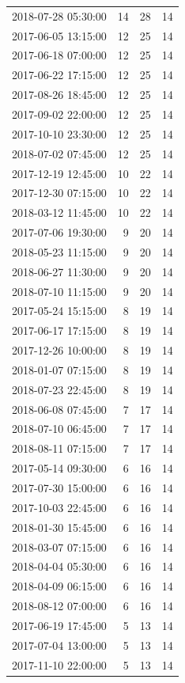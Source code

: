 \begin{tabular}{lrrr}
2018-07-28 05:30:00 & 14 & 28 & 14 \\
2017-06-05 13:15:00 & 12 & 25 & 14 \\
2017-06-18 07:00:00 & 12 & 25 & 14 \\
2017-06-22 17:15:00 & 12 & 25 & 14 \\
2017-08-26 18:45:00 & 12 & 25 & 14 \\
2017-09-02 22:00:00 & 12 & 25 & 14 \\
2017-10-10 23:30:00 & 12 & 25 & 14 \\
2018-07-02 07:45:00 & 12 & 25 & 14 \\
2017-12-19 12:45:00 & 10 & 22 & 14 \\
2017-12-30 07:15:00 & 10 & 22 & 14 \\
2018-03-12 11:45:00 & 10 & 22 & 14 \\
2017-07-06 19:30:00 & 9 & 20 & 14 \\
2018-05-23 11:15:00 & 9 & 20 & 14 \\
2018-06-27 11:30:00 & 9 & 20 & 14 \\
2018-07-10 11:15:00 & 9 & 20 & 14 \\
2017-05-24 15:15:00 & 8 & 19 & 14 \\
2017-06-17 17:15:00 & 8 & 19 & 14 \\
2017-12-26 10:00:00 & 8 & 19 & 14 \\
2018-01-07 07:15:00 & 8 & 19 & 14 \\
2018-07-23 22:45:00 & 8 & 19 & 14 \\
2018-06-08 07:45:00 & 7 & 17 & 14 \\
2018-07-10 06:45:00 & 7 & 17 & 14 \\
2018-08-11 07:15:00 & 7 & 17 & 14 \\
2017-05-14 09:30:00 & 6 & 16 & 14 \\
2017-07-30 15:00:00 & 6 & 16 & 14 \\
2017-10-03 22:45:00 & 6 & 16 & 14 \\
2018-01-30 15:45:00 & 6 & 16 & 14 \\
2018-03-07 07:15:00 & 6 & 16 & 14 \\
2018-04-04 05:30:00 & 6 & 16 & 14 \\
2018-04-09 06:15:00 & 6 & 16 & 14 \\
2018-08-12 07:00:00 & 6 & 16 & 14 \\
2017-06-19 17:45:00 & 5 & 13 & 14 \\
2017-07-04 13:00:00 & 5 & 13 & 14 \\
2017-11-10 22:00:00 & 5 & 13 & 14 \\

\end{tabular}
